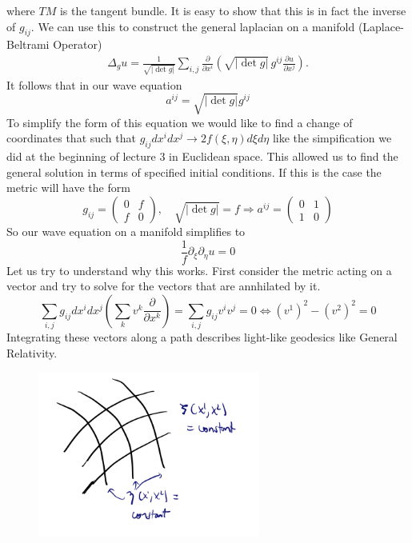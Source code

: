 \documentclass[11pt,a4paper]{article}
\begin{document}
where $TM$ is the tangent bundle. It is easy to show that this is in fact the inverse of $g_{ij}$. We can use this to construct the general laplacian on a manifold (Laplace-Beltrami Operator)
\begin{align}
	\Delta_{g} u 
	= \frac{1}{\sqrt{|\det g|}}
	\sum_{i,j}
	\frac{\partial}{\partial x^{i}}
	\!\left(
	\sqrt{|\det g|}\, g^{ij}
	\frac{\partial u}{\partial x^{j}}
	\right).
\end{align}
It follows that in our wave equation
$$
a^{ij} = \sqrt{|\det{g}|}g^{ij}
$$
To simplify the form of this equation we would like to find a change of coordinates that such that $g_{ij}dx^{i}dx^{j}\to 2f(\xi,\eta)d\xi d\eta$ like the simpification we did at the beginning of lecture 3 in Euclidean space. This allowed us to find the general solution in terms of specified initial conditions. If this is the case the metric will have the form
$$
g_{ij} = 
\begin{pmatrix}
	0 & f\\
	f & 0
\end{pmatrix}, \quad \sqrt{|\det{g}|} = f \Rightarrow a^{ij} = \begin{pmatrix}
0 & 1\\
1& 0
\end{pmatrix}
$$
So our wave equation on a manifold simplifies to 
$$ \frac{1}{f}\partial_{\xi}\partial_{\eta} u = 0$$
Let us try to understand why this works. First consider the metric acting on a vector and try to solve for the vectors that are annhilated by it.
$$
\sum_{i,j}g_{ij}dx^{i}dx^{j}(\sum_{k}v^{k}\frac{\partial}{\partial x^{k}}) = \sum_{i,j}g_{ij}v^{i}v^{j} = 0 \Leftrightarrow (v^{1})^{2}-(v^{2})^{2} = 0
$$
Integrating these vectors along a path describes light-like geodesics like General Relativity. \begin{figure}[H]
	\centering
	\includegraphics[width=0.65\textwidth]{desiredcoordinates.png} %
\end{figure}
\end{document}
